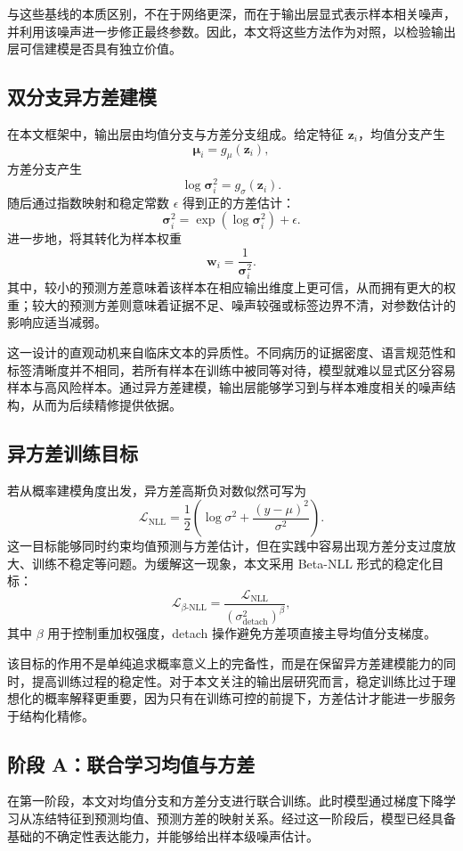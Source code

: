 \method{} 与这些基线的本质区别，不在于网络更深，而在于输出层显式表示样本相关噪声，并利用该噪声进一步修正最终参数。因此，本文将这些方法作为对照，以检验输出层可信建模是否具有独立价值。

\subsection{双分支异方差建模}
在本文框架中，输出层由均值分支与方差分支组成。给定特征 $\mathbf{z}_i$，均值分支产生
\[
\boldsymbol{\mu}_i = g_{\mu}(\mathbf{z}_i),
\]
方差分支产生
\[
\log \boldsymbol{\sigma}_i^2 = g_{\sigma}(\mathbf{z}_i).
\]
随后通过指数映射和稳定常数 $\epsilon$ 得到正的方差估计：
\[
\boldsymbol{\sigma}_i^2 = \exp(\log \boldsymbol{\sigma}_i^2) + \epsilon.
\]
进一步地，将其转化为样本权重
\[
\mathbf{w}_i = \frac{1}{\boldsymbol{\sigma}_i^2}.
\]
其中，较小的预测方差意味着该样本在相应输出维度上更可信，从而拥有更大的权重；较大的预测方差则意味着证据不足、噪声较强或标签边界不清，对参数估计的影响应适当减弱。

这一设计的直观动机来自临床文本的异质性。不同病历的证据密度、语言规范性和标签清晰度并不相同，若所有样本在训练中被同等对待，模型就难以显式区分容易样本与高风险样本。通过异方差建模，输出层能够学习到与样本难度相关的噪声结构，从而为后续精修提供依据。

\subsection{异方差训练目标}
若从概率建模角度出发，异方差高斯负对数似然可写为
\[
\mathcal{L}_{\text{NLL}} = \frac{1}{2}\left(\log \sigma^2 + \frac{(y-\mu)^2}{\sigma^2}\right).
\]
这一目标能够同时约束均值预测与方差估计，但在实践中容易出现方差分支过度放大、训练不稳定等问题。为缓解这一现象，本文采用 Beta-NLL 形式的稳定化目标：
\[
\mathcal{L}_{\beta\text{-NLL}} = \frac{\mathcal{L}_{\text{NLL}}}{(\sigma^2_{\text{detach}})^{\beta}},
\]
其中 $\beta$ 用于控制重加权强度，detach 操作避免方差项直接主导均值分支梯度。

该目标的作用不是单纯追求概率意义上的完备性，而是在保留异方差建模能力的同时，提高训练过程的稳定性。对于本文关注的输出层研究而言，稳定训练比过于理想化的概率解释更重要，因为只有在训练可控的前提下，方差估计才能进一步服务于结构化精修。

\subsection{阶段 A：联合学习均值与方差}
在第一阶段，本文对均值分支和方差分支进行联合训练。此时模型通过梯度下降学习从冻结特征到预测均值、预测方差的映射关系。经过这一阶段后，模型已经具备基础的不确定性表达能力，并能够给出样本级噪声估计。

